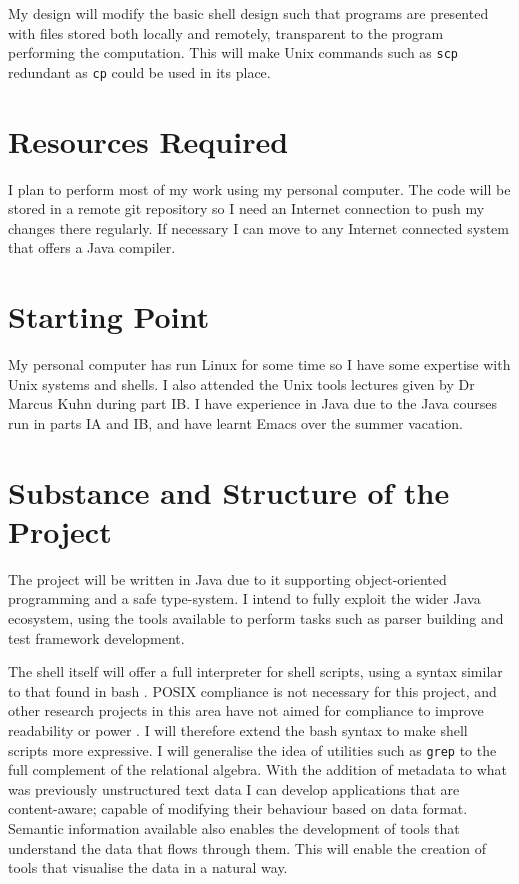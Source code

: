 \documentclass[12pt]{article}
\begin{document}
My design will modify the basic shell design such that programs are
presented with files stored both locally and remotely, transparent to
the program performing the computation. This will make Unix commands
such as \texttt{scp} redundant as \texttt{cp} could be used in its
place.

\section*{Resources Required}
I plan to perform most of my work using my personal computer. The code
will be stored in a remote git repository so I need an Internet
connection to push my changes there regularly. If necessary I can move
to any Internet connected system that offers a Java compiler.

\section*{Starting Point}
My personal computer has run Linux for some time so I have some
expertise with Unix systems and shells. I also attended the Unix tools
lectures given by Dr Marcus Kuhn during part IB. I have experience in
Java due to the Java courses run in parts IA and IB, and have learnt
Emacs over the summer vacation.

\section*{Substance and Structure of the Project}
The project will be written in Java due to it supporting
object-oriented programming and a safe type-system. I intend to fully
exploit the wider Java ecosystem, using the tools available to perform
tasks such as parser building and test framework development.

The shell itself will offer a full interpreter for shell scripts,
using a syntax similar to that found in bash \cite{bash}. POSIX
compliance \cite{posix} is not necessary for this project, and other
research projects in this area have not aimed for compliance to improve
readability \cite{fish} or power \cite{powershell}. I will therefore
extend the bash syntax to make shell scripts more expressive. I will
generalise the idea of utilities such as \texttt{grep} to the full
complement of the relational algebra. With the addition of metadata to
what was previously unstructured text data I can develop applications
that are content-aware; capable of modifying their behaviour based on
data format. Semantic information available also enables the
development of tools that understand the data that flows through
them. This will enable the creation of tools that visualise the data
in a natural way.
\end{document}
